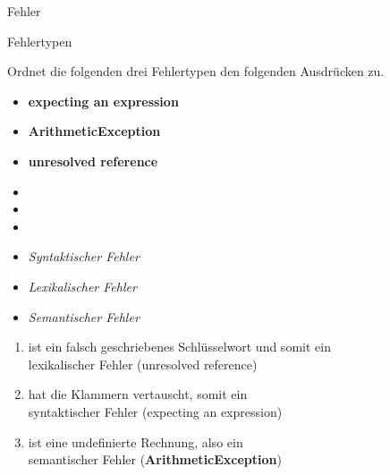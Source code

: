 \begin{task}[points=auto]{Fehler}
    \begin{subtask*}[points=0]{Fehlertypen }

        Ordnet die folgenden drei Fehlertypen den folgenden Ausdrücken zu.
        \begin{multicols}{3}
            \begin{itemize}
                \item[] \textbf{expecting an expression}
                \item[] \textbf{ArithmeticException}
                \item[] \textbf{unresolved reference}
            \end{itemize}
            \begin{itemize}
                \item[] 
                \item[] 
                \item[] 
            \end{itemize}
            \begin{itemize}
                \item[] \textit{Syntaktischer Fehler}
                \item[] \textit{Lexikalischer Fehler}
                \item[] \textit{Semantischer Fehler}
            \end{itemize}
        \end{multicols}

        \begin{solution}
            \begin{enumerate}
                \item {} ist ein falsch geschriebenes Schlüsselwort und somit ein \\
                    lexikalischer Fehler (unresolved reference)
                \item {} hat die Klammern vertauscht, somit ein \\
                    syntaktischer Fehler (expecting an expression)
                \item {} ist eine undefinierte Rechnung, also ein
                    \\ semantischer Fehler (\textbf{ArithmeticException})
            \end{enumerate}


\end{solution}
\end{subtask*}
\end{task}
